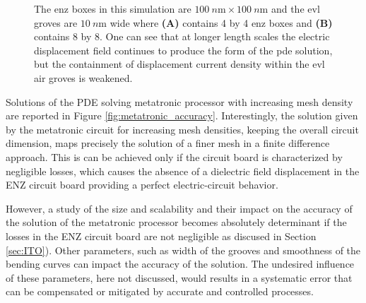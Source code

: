 \begin{figure}[ht]
\centering{}
\caption{The \acrfull{enz} boxes in this simulation are $\SI{100}{n\meter} \times \SI{100}{n\meter}$ and the \acrfull{evl} groves are $\SI{10}{n\meter}$ wide where \textbf{(A)} contains 4 by 4 \acrshort{enz} boxes and \textbf{(B)} contains 8 by 8. One can see that at longer length scales the electric displacement field continues to produce the form of the \acrshort{pde} solution, but the containment of displacement current density within the \acrshort{evl} air groves is weakened.} 
\label{fig:metatronic_size_simulation}
\end{figure}

\par Solutions of the PDE solving metatronic processor with increasing mesh density are reported in Figure \ref{fig:metatronic_accuracy}. Interestingly, the solution given by the metatronic circuit for increasing mesh densities, keeping the overall circuit dimension, maps precisely the solution of a finer mesh in a finite difference approach.  This is can be achieved only if the circuit board is characterized by negligible losses, which causes the absence of a dielectric field displacement in the ENZ circuit board providing a perfect electric-circuit behavior. 

\par However, a study of the size and scalability and their impact on the accuracy of the solution of the metatronic processor becomes absolutely determinant if the losses in the ENZ circuit board are not negligible as discused in Section \ref{sec:ITO}). Other parameters, such as width of the grooves and smoothness of the bending curves can impact the accuracy of the solution. The undesired influence of these parameters, here not discussed,  would results in a systematic error that can be compensated or mitigated by accurate and controlled processes.

